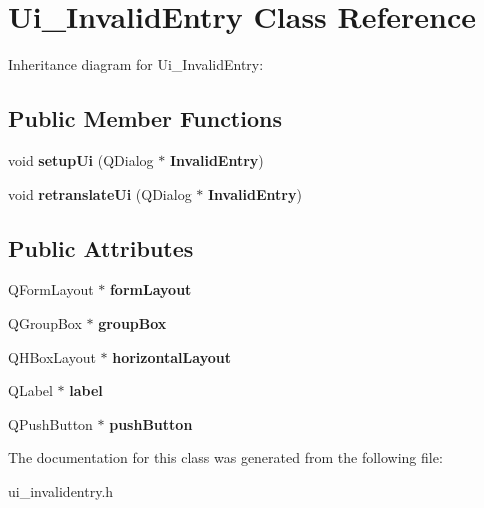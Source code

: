 \section{Ui\+\_\+\+Invalid\+Entry Class Reference}
\label{class_ui___invalid_entry}


Inheritance diagram for Ui\+\_\+\+Invalid\+Entry\+:
\subsection*{Public Member Functions}
\begin{DoxyCompactItemize}
\item 
\mbox{\label{class_ui___invalid_entry_abe0704819da22138fe7a668df23364f2}} 
void {\bfseries setup\+Ui} (Q\+Dialog $\ast$\textbf{ Invalid\+Entry})
\item 
\mbox{\label{class_ui___invalid_entry_a962bb2f98c14ef2053725598769180e4}} 
void {\bfseries retranslate\+Ui} (Q\+Dialog $\ast$\textbf{ Invalid\+Entry})
\end{DoxyCompactItemize}
\subsection*{Public Attributes}
\begin{DoxyCompactItemize}
\item 
\mbox{\label{class_ui___invalid_entry_ac36b56cac8479fc4aaac6eaba5ede142}} 
Q\+Form\+Layout $\ast$ {\bfseries form\+Layout}
\item 
\mbox{\label{class_ui___invalid_entry_a55774b22f160e0dfa9d53565f9557140}} 
Q\+Group\+Box $\ast$ {\bfseries group\+Box}
\item 
\mbox{\label{class_ui___invalid_entry_ac55ce803c734e6da8cbc48f79cb1f4f0}} 
Q\+H\+Box\+Layout $\ast$ {\bfseries horizontal\+Layout}
\item 
\mbox{\label{class_ui___invalid_entry_a311b88464ba6af69a5e8ffc47f57b906}} 
Q\+Label $\ast$ {\bfseries label}
\item 
\mbox{\label{class_ui___invalid_entry_a95e7963661a739ae9b75bc078dd391aa}} 
Q\+Push\+Button $\ast$ {\bfseries push\+Button}
\end{DoxyCompactItemize}


The documentation for this class was generated from the following file\+:\begin{DoxyCompactItemize}
\item 
ui\+\_\+invalidentry.\+h\end{DoxyCompactItemize}
